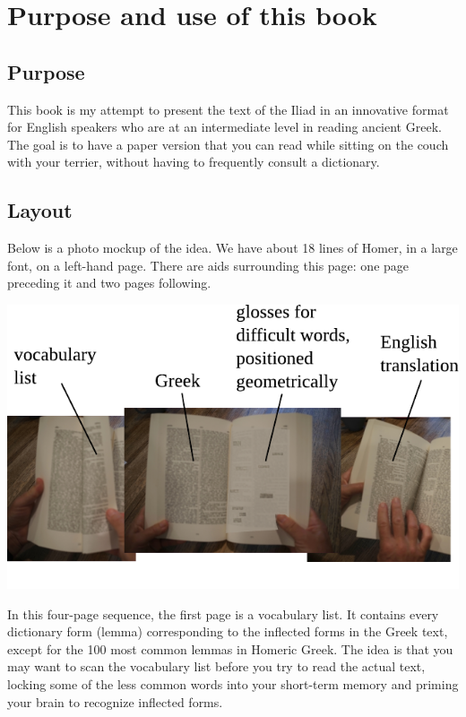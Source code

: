 \chapter*{Purpose and use of this book}

{\small

\section*{Purpose}

This book is my attempt to present the text of the Iliad in an innovative format
for English speakers who are at an intermediate level in reading ancient Greek.
The goal is to have a paper version that you can read while sitting on the couch
with your terrier, without having to frequently consult a dictionary.

\section*{Layout}

Below is a photo mockup of the
idea. We have about 18 lines of Homer, in a large font, on a left-hand
page. There are aids surrounding this page: one page preceding it and
two pages following.

\includegraphics{iliad/figs/manual}

In this four-page sequence, the first page is a vocabulary list. It
contains every dictionary form (lemma) corresponding to the inflected
forms in the Greek text, except for the 100 most common lemmas in
Homeric Greek. The idea is that you may want to scan the vocabulary
list before you try to read the actual text, locking some of the less
common words into your short-term memory and priming your brain to
recognize inflected forms.

}
